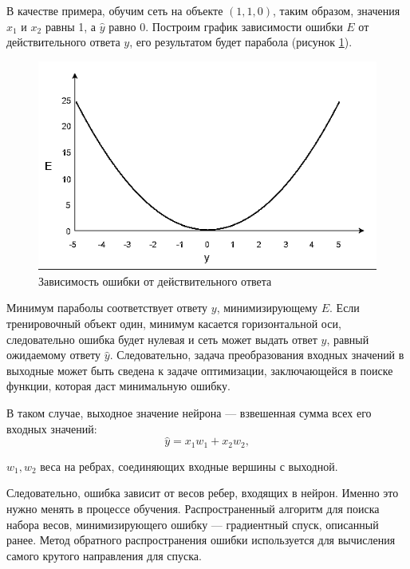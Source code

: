 В качестве примера, обучим сеть на объекте $(1, 1, 0)$, таким образом, значения $x_1$ и $x_2$ равны 1, а $\hat{y}$ равно 0. Построим график зависимости ошибки $E$ от действительного ответа $y$, его результатом будет парабола (рисунок \ref{fig:error}).

\begin{figure}[H]
	\centering
	\includegraphics[width=\textwidth]{img/error.png}
	\caption{Зависимость ошибки от действительного ответа}
	\label{fig:error}
\end{figure}

Минимум параболы соответствует ответу $y$, минимизирующему $E$. Если тренировочный объект один, минимум касается горизонтальной оси, следовательно ошибка будет нулевая и сеть может выдать ответ $y$, равный ожидаемому ответу $\hat{y}$. Следовательно, задача преобразования входных значений в выходные может быть сведена к задаче оптимизации, заключающейся в поиске функции, которая даст минимальную ошибку.

В таком случае, выходное значение нейрона --- взвешенная сумма всех его входных значений:
\begin{equation}
	\label{eq:nn5}
	\hat{y} = x_1w_1 + x_2w_2,
\end{equation}
\begin{eqexpl}[15mm]
	\item{$w_1, w_2$} веса на ребрах, соединяющих входные вершины с выходной.
\end{eqexpl}

Следовательно, ошибка зависит от весов ребер, входящих в нейрон. Именно это нужно менять в процессе обучения. Распространенный алгоритм для поиска набора весов, минимизирующего ошибку --- градиентный спуск, описанный ранее. Метод обратного распространения ошибки используется для вычисления самого крутого направления для спуска.

